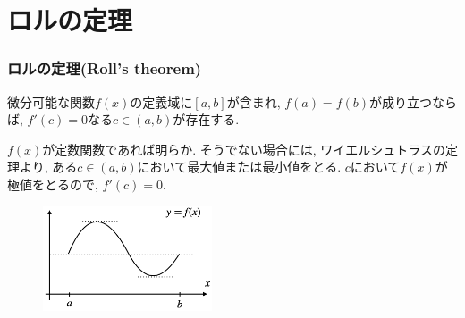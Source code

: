 




\section{ロルの定理}


\begin{frame}
\frametitle{ロルの定理(Roll's theorem)}


\begin{Thm}[ロルの定理]
微分可能な関数$f(x)$の定義域に$[a,b]$が含まれ, $f(a)=f(b)$が成り立つならば, 
$f'(c)=0$なる$c \in (a,b)$が存在する. 
\end{Thm}

$f(x)$が定数関数であれば明らか. 
そうでない場合には, ワイエルシュトラスの定理より, ある$c \in (a,b)$において最大値または最小値をとる. 
$c$において$f(x)$が極値をとるので, $f'(c)=0$. 

 \begin{figure}[htbp]
 \begin{center} 
  \includegraphics[width=50mm]{calculus8/Roll.png}
 \end{center}
\end{figure}

\end{frame}







